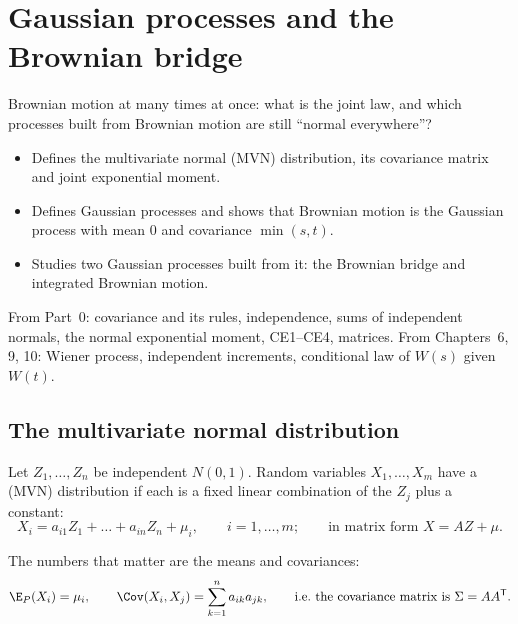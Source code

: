 \chapter{Gaussian processes and the Brownian bridge}
\label{ch:gaussian}

\begin{question}
Brownian motion at many times at once: what is the joint law, and which processes built from Brownian motion are still ``normal everywhere''?
\end{question}

\begin{whatfor}
\begin{itemize}
  \item Defines the multivariate normal (MVN) distribution, its covariance matrix and joint exponential moment.
  \item Defines Gaussian processes and shows that Brownian motion is the Gaussian process with mean $0$ and covariance $\min(s,t)$.
  \item Studies two Gaussian processes built from it: the Brownian bridge and integrated Brownian motion.
\end{itemize}
\end{whatfor}

\begin{prereq}
From Part~0: covariance and its rules, independence, sums of independent normals, the normal exponential moment, CE1--CE4, matrices. From Chapters~6, 9, 10: Wiener process, independent increments, conditional law of $W(s)$ given $W(t)$.
\end{prereq}

\section{The multivariate normal distribution}

\begin{definition}
\label{def:mvn}
Let $Z_1,\dots,Z_n$ be independent $N(0,1)$. Random variables $X_1,\dots,X_m$ have a  (MVN) distribution if each is a fixed linear combination of the $Z_j$ plus a constant:
\[
  X_i=a_{i1}Z_1+\dots+a_{in}Z_n+\mu_i,\qquad i=1,\dots,m;\qquad\text{in matrix form } X=AZ+\mu .
\]
\end{definition}

The numbers that matter are the means and covariances:
\[
  \E_P(X_i)=\mu_i,\qquad \Cov(X_i,X_j)=\sum_{k=1}^na_{ik}a_{jk},\qquad\text{i.e.\ the covariance matrix is }\Sigma=AA^{\mathsf T}.
\]

